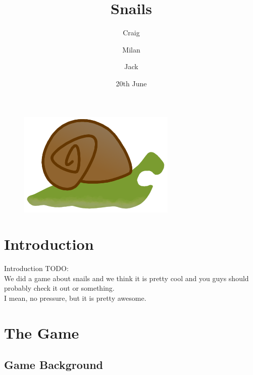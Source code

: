 \documentclass{beamer}
\title{Snails}
\author{Craig \and Milan \and Jack}
\date{20th June}
\begin{document}
\begin{frame}
  \titlepage
  \vspace{\baselineskip}
  \begin{figure}
    \includegraphics[scale=0.15]{snail_teeth.png}
  \end{figure}
\end{frame}

\section{Introduction}

\begin{frame}{Introduction}
  TODO:\\
  \vspace{\baselineskip}
  We did a game about snails and we think it is pretty cool and you guys should probably check it out or something.\\
  \vspace{\baselineskip}
  I mean, no pressure, but it is pretty awesome.
\end{frame}


\section{The Game}
\subsection{Game Background}
\end{document}

